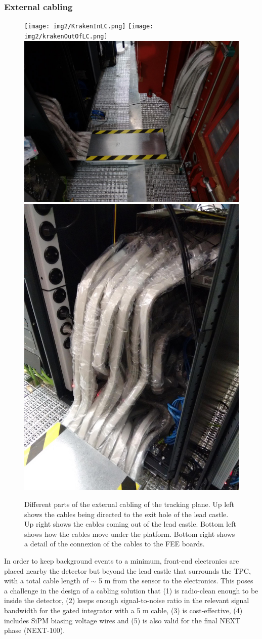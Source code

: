\subsubsection*{External cabling}\label{sec:ext}


\begin{figure}[hpt!]
\centering
\texttt{[image: img2/KrakenInLC.png]}
\texttt{[image: img2/krakenOutOfLC.png]}
\includegraphics[width=.45\textwidth]{img2/cabling_under_platform.png}
\includegraphics[width=.45\textwidth]{img2/cabling2FEE.png}
\caption{Different parts of the external cabling of the tracking plane. Up left shows the cables being directed to the exit hole of the lead castle. Up right shows the cables coming out of the lead castle. Bottom left shows how the cables move under the platform. Bottom right shows a detail of the connexion of the cables to the FEE boards.}
\label{fig:external_installation}
\end{figure}

In order to keep background events to a minimum, front-end electronics are placed nearby the detector but beyond the lead castle that surrounds the TPC, with a total cable length of $\sim$ 5 m from the sensor to the electronics. This poses a challenge in the design of a cabling solution that (1) is radio-clean enough to be inside the detector, (2) keeps enough signal-to-noise ratio in the relevant signal bandwidth for the gated integrator with a 5 m cable, (3) is cost-effective, (4) includes SiPM biasing voltage wires and (5) is also valid for the final NEXT phase (NEXT-100).

